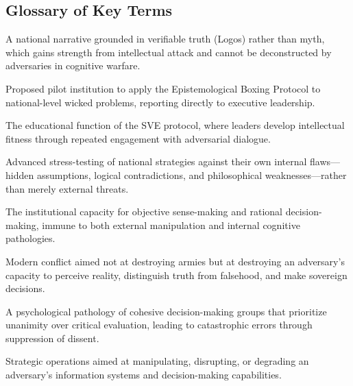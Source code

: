 \documentclass[11pt,a4paper]{article}
\begin{document}
\begin{small}
\section*{Glossary of Key Terms}

\begin{description}[style=nextline, leftmargin=0pt, labelindent=0pt, font=\normalfont\bfseries]
    \item[Antifragile Ideology] A national narrative grounded in verifiable truth (Logos) rather than myth, which gains strength from intellectual attack and cannot be deconstructed by adversaries in cognitive warfare.
    
    \item[Center for Strategic Verification (ЦСАП)] Proposed pilot institution to apply the Epistemological Boxing Protocol to national-level wicked problems, reporting directly to executive leadership.
    
    \item[Cognitive Gymnasium] The educational function of the SVE protocol, where leaders develop intellectual fitness through repeated engagement with adversarial dialogue.
    
    \item[Cognitive Red Teaming] Advanced stress-testing of national strategies against their own internal flaws—hidden assumptions, logical contradictions, and philosophical weaknesses—rather than merely external threats.
    
    \item[Cognitive Sovereignty] The institutional capacity for objective sense-making and rational decision-making, immune to both external manipulation and internal cognitive pathologies.
    
    \item[Cognitive Warfare] Modern conflict aimed not at destroying armies but at destroying an adversary's capacity to perceive reality, distinguish truth from falsehood, and make sovereign decisions.
    
    \item[Groupthink] A psychological pathology of cohesive decision-making groups that prioritize unanimity over critical evaluation, leading to catastrophic errors through suppression of dissent.
    
    \item[Information Warfare] Strategic operations aimed at manipulating, disrupting, or degrading an adversary's information systems and decision-making capabilities.
    

\end{description}
\end{small}
\end{document}
